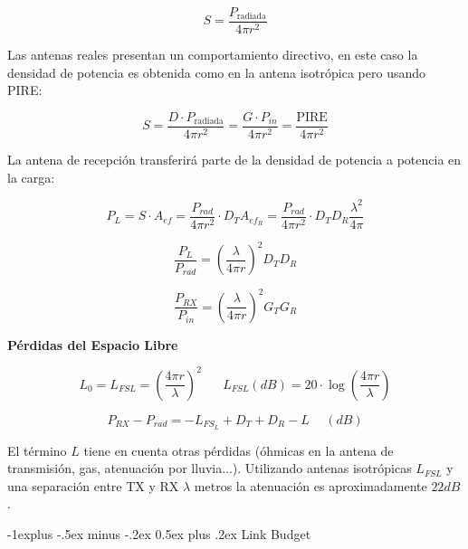 \documentclass[10pt,portrait, twocolumn]{article}
\makeatletter
\renewcommand{\subsection}{\@startsection{subsection}{2}{0mm}%
                                {-1explus -.5ex minus -.2ex}%
                                {0.5ex plus .2ex}%
                                {\normalfont\normalsize\bfseries}}
\makeatother
\begin{document}
	\begin{equation*}
	S = \frac{P_{\text{radiada}}}{4 \pi r^{2}}
	\end{equation*}
	
Las antenas reales presentan un comportamiento directivo, en este caso la densidad de potencia es obtenida como en la antena isotrópica pero usando PIRE:

	\begin{equation*}
	S =  \frac{D \cdot P_{\text{radiada}}}{4 \pi r^{2}} = \frac{G \cdot P_{in}}{4 \pi r^{2}} = \frac{\text{PIRE}}{4 \pi r^{2}}
	\end{equation*}

La antena de recepción transferirá parte de la densidad de potencia a potencia en la carga:

	\begin{equation*}
	P_{L} = S \cdot A_{ef} = \frac{P_{rad}}{4 \pi r^{2}} \cdot D_{T} A_{ef_{R}} = \frac{P_{rad}}{4 \pi r^{2}} \cdot D_{T} D_{R} \frac{\lambda^{2}}{4 \pi}
	\end{equation*}
	
	\begin{equation*}
	\frac{P_{L}}{P_{rad}} = \left( \frac{\lambda}{4 \pi r} \right)^{2} D_{T} D_{R}
	\end{equation*}
	
	\begin{equation*}
	\frac{P_{RX}}{P_{in}} = \left( \frac{\lambda}{4 \pi r} \right)^{2} G_{T} G_{R}
	\end{equation*}

\textbf{Pérdidas del Espacio Libre}

	\begin{equation*}
	L_{0} = L_{FSL} = \left( \frac{4 \pi r}{\lambda} \right)^{2} \hspace{20pt} L_{FSL} (dB) = 20 \cdot \log \left( \frac{4 \pi r}{\lambda} \right)
	\end{equation*}

\begin{equation*}
P_{RX} - P_{rad} = -L_{FS_{L}} + D_{T} + D_{R} - L \hspace{15pt} (dB)
\end{equation*}

El término $L$ tiene en cuenta otras pérdidas (óhmicas en la antena de transmisión, gas, atenuación por lluvia...). Utilizando antenas isotrópicas $L_{FSL}$ y una separación entre TX y RX $\lambda$ metros la atenuación es aproximadamente $22dB$.

\subsection{Link Budget}
\end{document}
